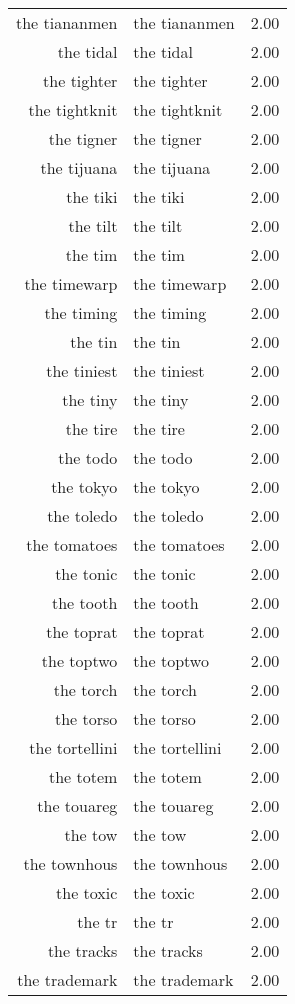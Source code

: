 \begin{table}[ht]
\begin{tabular}{rlr}
  the tiananmen & the tiananmen & 2.00 \\ 
  the tidal & the tidal & 2.00 \\ 
  the tighter & the tighter & 2.00 \\ 
  the tightknit & the tightknit & 2.00 \\ 
  the tigner & the tigner & 2.00 \\ 
  the tijuana & the tijuana & 2.00 \\ 
  the tiki & the tiki & 2.00 \\ 
  the tilt & the tilt & 2.00 \\ 
  the tim & the tim & 2.00 \\ 
  the timewarp & the timewarp & 2.00 \\ 
  the timing & the timing & 2.00 \\ 
  the tin & the tin & 2.00 \\ 
  the tiniest & the tiniest & 2.00 \\ 
  the tiny & the tiny & 2.00 \\ 
  the tire & the tire & 2.00 \\ 
  the todo & the todo & 2.00 \\ 
  the tokyo & the tokyo & 2.00 \\ 
  the toledo & the toledo & 2.00 \\ 
  the tomatoes & the tomatoes & 2.00 \\ 
  the tonic & the tonic & 2.00 \\ 
  the tooth & the tooth & 2.00 \\ 
  the toprat & the toprat & 2.00 \\ 
  the toptwo & the toptwo & 2.00 \\ 
  the torch & the torch & 2.00 \\ 
  the torso & the torso & 2.00 \\ 
  the tortellini & the tortellini & 2.00 \\ 
  the totem & the totem & 2.00 \\ 
  the touareg & the touareg & 2.00 \\ 
  the tow & the tow & 2.00 \\ 
  the townhous & the townhous & 2.00 \\ 
  the toxic & the toxic & 2.00 \\ 
  the tr & the tr & 2.00 \\ 
  the tracks & the tracks & 2.00 \\ 
  the trademark & the trademark & 2.00 \\ 

\end{tabular}
\end{table}
